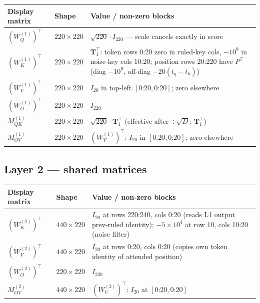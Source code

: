 \documentclass[11pt]{article}
\begin{document}
\begin{center}
\begin{tabular}{llp{8.5cm}}
\toprule
\textbf{Display matrix} & \textbf{Shape} & \textbf{Value / non-zero blocks}\\
\midrule
$(W_Q^{(1)})^\top$ & $220\times220$
  & $\sqrt{220}\cdot I_{220}$ --- scale cancels exactly in score\\
$(W_K^{(1)})^\top$ & $220\times220$
  & $\boldsymbol{T}_1^\top$: token rows 0:20 zero in ruled-key cols, $-10^9$ in noise-key cols 10:20;
    position rows 20:220 have $P^\top$ (diag $-10^9$, off-diag $-20(t_q{-}t_k)$)\\
$(W_V^{(1)})^\top$ & $220\times220$
  & $I_{20}$ in top-left $[0\text{:}20,0\text{:}20]$; zero elsewhere\\
$(W_O^{(1)})^\top$ & $220\times220$ & $I_{220}$\\
\midrule
$M_{QK}^{(1)}$ & $220\times220$
  & $\sqrt{220}\cdot\boldsymbol{T}_1^\top$ (effective after $\div\sqrt{D}$: $\boldsymbol{T}_1^\top$)\\
$M_{OV}^{(1)}$ & $220\times220$
  & $(W_V^{(1)})^\top$: $I_{20}$ in $[0\text{:}20,0\text{:}20]$; zero elsewhere\\
\bottomrule
\end{tabular}
\end{center}

\subsection{Layer 2 --- shared matrices}

\begin{center}
\begin{tabular}{llp{8.5cm}}
\toprule
\textbf{Display matrix} & \textbf{Shape} & \textbf{Value / non-zero blocks}\\
\midrule
$(W_K^{(2)})^\top$ & $440\times220$
  & $I_{20}$ at rows 220:240, cols 0:20 (reads L1 output prev-ruled identity);
    $-5\times10^4$ at row 10, cols 10:20 (noise filter)\\
$(W_V^{(2)})^\top$ & $440\times220$
  & $I_{20}$ at rows 0:20, cols 0:20 (copies own token identity of attended position)\\
$(W_O^{(2)})^\top$ & $220\times220$ & $I_{220}$\\
$M_{OV}^{(2)}$     & $440\times220$
  & $(W_V^{(2)})^\top$: $I_{20}$ at $[0\text{:}20,0\text{:}20]$\\
\bottomrule
\end{tabular}
\end{center}
\end{document}

